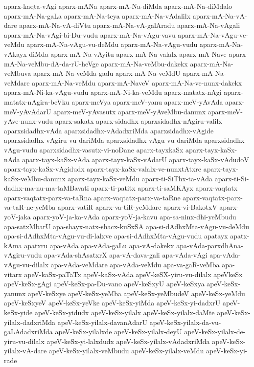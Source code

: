 {aparx-kaqta-vAgi
aparx-mANa
aparx-mA-Na-diMda
aparx-mA-Na-diMdalo
aparx-mA-Na-gaLa
aparx-mA-Na-teya
aparx-mA-Na-vAdalilx
aparx-mA-Na-vA-dare
aparx-mA-Na-vA-diVtu
aparx-mA-Na-vA-galAradu
aparx-mA-Na-vAgali
aparx-mA-Na-vAgi-bi-Du-vudu
aparx-mA-Na-vAgu-vavu
aparx-mA-Na-vAgu-ve-veMdu
aparx-mA-Na-vAgu-vu-deMdu
aparx-mA-Na-vAgu-vudu
aparx-mA-Na-vAkayx-diMda
aparx-mA-Na-vAyitu
aparx-mA-Na-valalx
aparx-mA-Nave
aparx-mA-Na-veMbu-dA-da-rU-heVge
aparx-mA-Na-veMbu-dakekx
aparx-mA-Na-veMbuva
aparx-mA-Na-veMda-gadu
aparx-mA-Na-veMdU
aparx-mA-Na-veMdare
aparx-mA-Na-veMdu
aparx-mA-NaveV
aparx-mA-Na-ve-nunx-dakekx
aparx-mA-Ni-ka-vAgu-vudu
aparx-mA-Ni-ka-veMdu
aparx-matatx-nAgi
aparx-matatx-nAgira-beVku
aparx-meVya
aparx-meV-yanu
aparx-meV-yAvAda
aparx-meV-yAvAdarU
aparx-meV-yAvasutx
aparx-meV-yAveMbu-danunx
aparx-meV-yAve-nunx-vudu
aparx-sakatx
aparx-sidadhx
aparxsidadhx-nAgiru-valilx
aparxsidadhx-vAda
aparxsidadhx-vAdadxriMda
aparxsidadhx-vAgide
aparxsidadhx-vAgiru-vu-dariMda
aparxsidadhx-vAgu-vu-dariMda
aparxsidadhx-vAgu-vudu
aparxsidadhx-vasutx-vi-noDane
aparx-tayxkaSx
aparx-tayx-kaSx-nAda
aparx-tayx-kaSx-vAda
aparx-tayx-kaSx-vAdarU
aparx-tayx-kaSx-vAdudoV
aparx-tayx-kaSx-vAgidudx
aparx-tayx-kaSx-valalx-ve-nunxtAtxre
aparx-tayx-kaSx-veMbu-danunx
aparx-tayx-kaSx-veMdu
aparx-ti-SiThx-ta-vAda
aparx-ti-Si-dadhx-ma-nu-ma-taMBavati
aparx-ti-patitx
aparx-ti-saMKAyx
aparx-vaqtatx
aparx-vaqtatx-parx-va-taRna
aparx-vaqtatx-parx-va-taRne
aparx-vaqtatx-parx-va-taR-ne-yeMba
aparx-vatiR
aparx-va-tiR-yeMdare
aparx-vi-BakotxV
aparx-yoV-jaka
aparx-yoV-ja-ka-vAda
aparx-yoV-ja-kavu
apa-sa-ninx-dhi-yeMbudu
apa-satxMbarU
apa-shayx-natx-shacx-kuSxSA
apa-si-dAdhxMta-vAgu-vu-deMdu
apa-si-dAdhxMta-vAgu-vu-di-lalxve
apa-si-dAdhxMta-vAgu-vudu
apatayx
apatx-kAma
apatxru
apa-vAda
apa-vAda-gaLu
apa-vA-dakekx
apa-vAda-parxdhAna-vAgiru-vudu
apa-vAda-shAsatxrX
apa-vA-dava-gali
apa-vAda-vAgi
apa-vAda-vAgu-vu-dilalx
apa-vAda-veMdare
apa-vAda-veMdu
apa-va-gaR-veMba
apa-vitarx
apeV-kaSx-paTaTx
apeV-kaSx-vAda
apeV-keSX-yiru-vu-dilalx
apeVkeSx
apeV-keSx-gAgi
apeV-keSx-pa-Du-vano
apeV-keSxyU
apeV-keSxya
apeV-keSx-yanunx
apeV-keSxye
apeV-keSx-yeMba
apeV-keSx-yeMbudeV
apeV-keSx-yeMdu
apeV-keSxyeV
apeV-keSx-yeVke
apeV-keSx-yiMda
apeV-keSx-yi-dadxrU
apeV-keSx-yide
apeV-keSx-yidudx
apeV-keSx-yilalx
apeV-keSx-yilalx-daMte
apeV-keSx-yilalx-dadxriMda
apeV-keSx-yilalx-davanAdarU
apeV-keSx-yilalx-da-vu-gaLAdadxriMda
apeV-keSx-yilalxde
apeV-keSx-yilalx-deyU
apeV-keSx-yilalx-de-yiru-vu-dilalx
apeV-keSx-yi-lalxdudx
apeV-keSx-yilalx-vAdadxriMda
apeV-keSx-yilalx-vA-dare
apeV-keSx-yilalx-veMbudu
apeV-keSx-yilalx-veMdu
apeV-keSx-yi-rade
}
